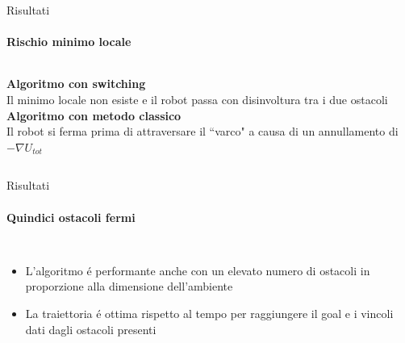 \documentclass[handout]{beamer}
\begin{document}
\begin{frame}{Risultati}
\framesubtitle{Rischio minimo locale}
\begin{columns}
\centering
\graphicspath{ {../simulazioni/minimilocali} }
\centering
\graphicspath{ {../simulazioni/minimiLocaliMesh} }
\end{columns}
\vspace{2mm}
\begin{columns}
\centering
\textbf{Algoritmo con switching}\\
Il minimo locale non esiste e il robot passa con disinvoltura tra i due ostacoli
\centering
\textbf{Algoritmo con metodo classico}\\
Il robot si ferma prima di attraversare il ``varco" a causa di un annullamento di $-\nabla U_{tot}$
\end{columns}

\end{frame}

\begin{frame}{Risultati}
\framesubtitle{Quindici ostacoli fermi}
\centering
\graphicspath{ {../simulazioni/moltiostacoli} }
\begin{columns}
\begin{itemize}
\item L'algoritmo é performante anche con un elevato numero di ostacoli in proporzione alla dimensione dell'ambiente
\item La traiettoria é ottima rispetto al tempo per raggiungere il goal e i vincoli dati dagli ostacoli presenti
\end{itemize}
\end{columns}
\end{frame}
\end{document}

